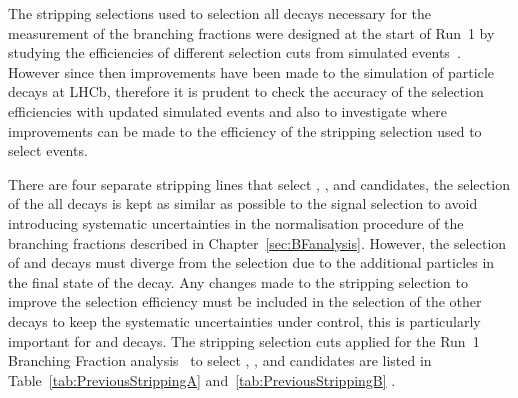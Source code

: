 The stripping selections used to selection all decays necessary for the measurement of the \bmumu branching fractions were designed at the start of Run~1 by studying the efficiencies of different selection cuts from simulated events~\cite{Diego}. However since then improvements have been made to the simulation of particle decays at LHCb, therefore it is prudent to check the accuracy of the selection efficiencies with updated simulated events and also to investigate where improvements can be made to the efficiency of the stripping selection used to select \bmumu events.



There are four separate stripping lines that select \bmumu, \bujpsik, \bsjpsiphi and \bhh candidates, the selection of the all decays is kept as similar as possible to the signal selection to avoid introducing systematic uncertainties in the normalisation procedure of the \bmumu branching fractions described in Chapter~\ref{sec:BFanalysis}. However, the selection of \bujpsik and \bsjpsiphi decays must diverge from the \bmumu selection due to the additional particles in the final state of the decay. Any changes made to the \bmumu stripping selection to improve the selection efficiency must be included in the selection of the other decays to keep the systematic uncertainties under control, this is particularly important for \bhh and \bujpsik decays. %
The stripping selection cuts applied for the Run~1 Branching Fraction analysis~\cite{CMS:2014xfa, Aaij:2013aka} to select \bmumu, \bujpsik, \bsjpsiphi and \bhh candidates are listed in Table~\ref{tab:PreviousStrippingA} and~\ref{tab:PreviousStrippingB} .


